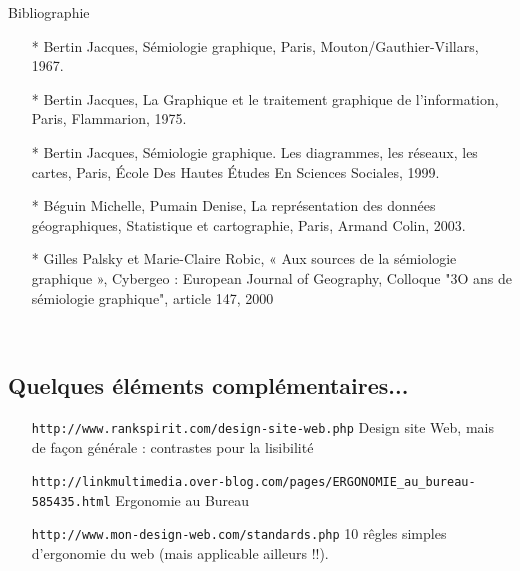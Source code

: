 \documentclass[11pt,twoside,a4paper]{article}
\begin{document}
Bibliographie~\cite{sourcesSemiologieGraphique,representationDonneesGeographiques,semiologieGraphique,traitementGraphiqueInformation,SemiologieGraphiqueMore}
\begin{itemize}
	\item[*] Bertin Jacques, S{\'e}miologie graphique, Paris, Mouton/Gauthier-Villars, 1967.
    \item[*] Bertin Jacques, La Graphique et le traitement graphique de l'information, Paris, Flammarion, 1975.
    \item[*] Bertin Jacques, S{\'e}miologie graphique. Les diagrammes, les r{\'e}seaux, les cartes, Paris, {\'E}cole Des Hautes {\'E}tudes En Sciences Sociales, 1999.
    \item[*] B{\'e}guin Michelle, Pumain Denise, La repr{\'e}sentation des donn{\'e}es g{\'e}ographiques, Statistique et cartographie, Paris, Armand Colin, 2003.
    \item[*] Gilles Palsky et Marie-Claire Robic, « Aux sources de la s{\'e}miologie graphique », Cybergeo : European Journal of Geography, Colloque "3O ans de s{\'e}miologie graphique", article 147, 2000
\end{itemize}~\\

\subsection{Quelques {\'e}l{\'e}ments compl{\'e}mentaires...}

\begin{itemize}
	\item[] \texttt{http://www.rankspirit.com/design-site-web.php} Design site Web, mais de fa\c{c}on g{\'e}n{\'e}rale : contrastes pour la lisibilit{\'e}
	\item[] \texttt{http://linkmultimedia.over-blog.com/pages/ERGONOMIE\_au\_bureau-585435.html} Ergonomie au Bureau
	\item[] \texttt{http://www.mon-design-web.com/standards.php} 10 r{\^e}gles simples d'ergonomie du web (mais applicable ailleurs !!).
\end{itemize}~\\
\end{document}
